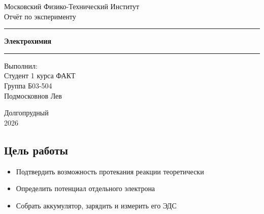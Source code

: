 \documentclass[a4paper, 12pt]{article}
\begin{document}

\begin{titlepage}
    \begin{center}

        \vspace*{5cm}

        {\Huge Московский Физико-Технический Институт}\\[2cm]

        {\LARGE Отчёт по эксперименту}\\[0.25cm]

        \noindent\rule{\textwidth}{1pt}
        \vspace*{-0.25cm}

        {\huge \textbf{Электрохимия}}

        \noindent\rule{\textwidth}{1pt}

        \vfill

    \end{center}

    \begin{flushright}
        \begin{minipage}{0.45\textwidth}
            {\Large
                Выполнил:\\
                Студент 1 курса ФАКТ\\
                Группа Б03-504\\
                Подмосковнов Лев
            }
        \end{minipage}
    \end{flushright}

    \vfill

    \begin{center}
        Долгопрудный\\2026
    \end{center}

\end{titlepage}
\restoregeometry

\setcounter{page}{2}

\subsection*{Цель работы}

\begin{itemize}[label=--]
    \item Подтвердить возможность протекания реакции теоретически
    \item Определить потенциал отдельного электрона
    \item Собрать аккумулятор, зарядить и измерить его ЭДС
\end{itemize}
\end{document}
